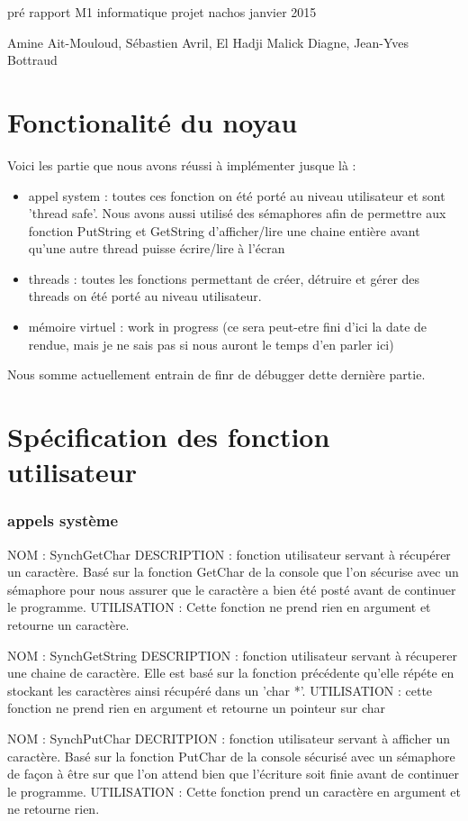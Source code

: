 pré rapport
M1 informatique
projet nachos
janvier 2015

Amine Ait-Mouloud, Sébastien Avril, El Hadji Malick Diagne, Jean-Yves Bottraud

\part{Fonctionalité du noyau}
Voici les partie que nous avons réussi à implémenter jusque là :
\begin{itemize}
\item appel system : toutes ces fonction on été porté au niveau utilisateur et sont 'thread safe'. Nous avons aussi utilisé des sémaphores afin de permettre aux fonction PutString et GetString d'afficher/lire une chaine entière avant qu'une autre thread puisse écrire/lire à l'écran
\item threads : toutes les fonctions permettant de créer, détruire et gérer des threads on été porté au niveau utilisateur.
\item mémoire virtuel : work in progress (ce sera peut-etre fini d'ici la date de rendue, mais je ne sais pas si nous auront le temps d'en parler ici)
\end{itemize}
Nous somme actuellement entrain de finr de débugger dette dernière partie.

\part{Spécification des fonction utilisateur}
\section{appels système}
NOM : SynchGetChar
DESCRIPTION : fonction utilisateur servant à récupérer un caractère. Basé sur la fonction GetChar de la console que l'on sécurise avec un sémaphore pour nous assurer que le caractère a bien été posté avant de continuer le programme.
UTILISATION : Cette fonction ne prend rien en argument et retourne un caractère.

NOM : SynchGetString
DESCRIPTION : fonction utilisateur servant à récuperer une chaine de caractère. Elle est basé sur la fonction précédente qu'elle répéte en stockant les caractères ainsi récupéré dans un 'char *'.
UTILISATION : cette fonction ne prend rien en argument et retourne un pointeur sur char

NOM : SynchPutChar
DECRITPION : fonction utilisateur servant à afficher un caractère. Basé sur la fonction PutChar de la console sécurisé avec un sémaphore de façon à être sur que l'on attend bien que l'écriture soit finie avant de continuer le programme.
UTILISATION : Cette fonction prend un caractère en argument et ne retourne rien.

